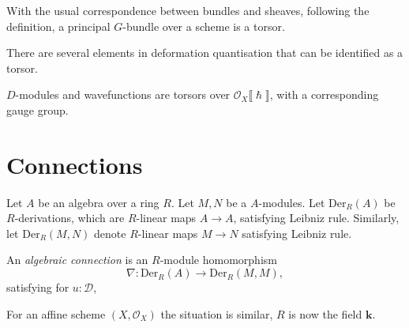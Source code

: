     \begin{ex} With the usual correspondence between bundles and sheaves, following the definition, a principal \(G\)-bundle over a scheme is a torsor.
    \end{ex}


    There are several elements in deformation quantisation that can be identified as a torsor.
    
    
    \begin{ex}
    \(D\)-modules and wavefunctions are torsors over \( \mathcal{O}_X \lBrack\hslash \rBrack\), with a corresponding gauge group. 
    \end{ex}
    
    \section{Connections}
    
    
    Let \(A\) be an algebra over a ring \(R\).
    Let \(M,N\) be a \(A\)-modules. Let \( \mathrm{Der}_{R}(A)\) be \(R\)-derivations, which are \(R\)-linear maps \( A \rightarrow A\), satisfying Leibniz rule. Similarly, let \( \mathrm{Der}_R(M,N)\) denote \(R\)-linear maps \(M \rightarrow N\) satisfying Leibniz rule.

    
    \begin{defn}
    An \emph{algebraic connection} is an \(R\)-module homomorphism \[ \nabla : \mathrm{Der}_R(A) \rightarrow \mathrm{Der}_R(M,M),\] satisfying for \( u : \mathcal{D}\), 
    
    \end{defn}
    
    For an affine scheme \((X,\mathcal{O}_X)\)  the situation is similar, \(R\) is now the field \( \mathbf{k}\).  
    